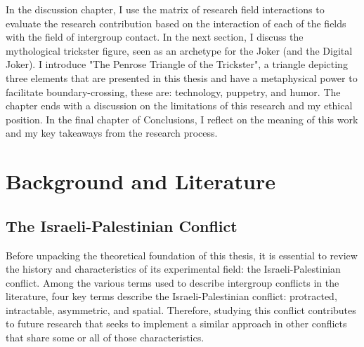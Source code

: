 \documentclass[dissertation,math,vertlayout,pdfa,colorlinks,nologo]{aaltoseries}
\begin{document}
In the discussion chapter, I use the matrix of research field interactions to evaluate the research contribution based on the interaction of each of the fields with the field of intergroup contact. In the next section, I discuss the mythological trickster figure, seen as an archetype for the Joker (and the Digital Joker). I introduce "The Penrose Triangle of the Trickster", a triangle depicting three elements that are presented in this thesis and have a metaphysical power to facilitate boundary-crossing, these are: technology, puppetry, and humor. The chapter ends with a discussion on the limitations of this research and my ethical position. In the final chapter of Conclusions, I reflect on the meaning of this work and my key takeaways from the research process.

\chapter{Background and Literature}
\section{The Israeli-Palestinian Conflict}
Before unpacking the theoretical foundation of this thesis, it is essential to review the history and characteristics of its experimental field: the Israeli-Palestinian conflict. Among the various terms used to describe intergroup conflicts in the literature, four key terms describe the Israeli-Palestinian conflict: protracted, intractable, asymmetric, and spatial. Therefore, studying this conflict contributes to future research that seeks to implement a similar approach in other conflicts that share some or all of those characteristics. 
\end{document}

